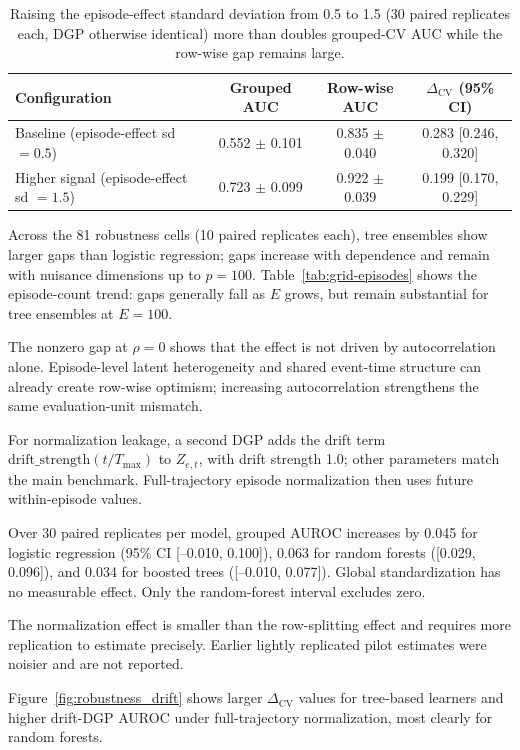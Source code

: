 \documentclass[runningheads]{llncs}
\newcommand{\1}{\mathbf{1}}
\newcommand{\DeltaCV}{\Delta_{\text{CV}}}
\begin{document}
\begin{table}[t]
\centering
\caption{Raising the episode-effect standard deviation from 0.5 to 1.5 (30 paired replicates each, DGP otherwise identical) more than doubles grouped-CV AUC while the row-wise gap remains large.}\label{tab:highsignal}
\small
\begin{tabular}{@{}lccc@{}}
\toprule
Configuration & Grouped AUC & Row-wise AUC & $\DeltaCV$ (95\% CI) \\
\midrule
Baseline (episode-effect sd $=0.5$) & 0.552 $\pm$ 0.101 & 0.835 $\pm$ 0.040 & 0.283 [0.246, 0.320] \\
Higher signal (episode-effect sd $=1.5$) & 0.723 $\pm$ 0.099 & 0.922 $\pm$ 0.039 & 0.199 [0.170, 0.229] \\
\bottomrule
\end{tabular}
\end{table}

Across the 81 robustness cells (10 paired replicates each), tree ensembles show larger gaps than logistic regression; gaps increase with dependence and remain with nuisance dimensions up to $p=100$. Table~\ref{tab:grid-episodes} shows the episode-count trend: gaps generally fall as $E$ grows, but remain substantial for tree ensembles at $E=100$.

The nonzero gap at $\rho=0$ shows that the effect is not driven by autocorrelation alone. Episode-level latent heterogeneity and shared event-time structure can already create row-wise optimism; increasing autocorrelation strengthens the same evaluation-unit mismatch.

For normalization leakage, a second DGP adds the drift term $\text{drift\_strength}(t/T_{\max})$ to $Z_{e,t}$, with drift strength 1.0; other parameters match the main benchmark. Full-trajectory episode normalization then uses future within-episode values.

Over 30 paired replicates per model, grouped AUROC increases by 0.045 for logistic regression (95\% CI [--0.010, 0.100]), 0.063 for random forests ([0.029, 0.096]), and 0.034 for boosted trees ([--0.010, 0.077]). Global standardization has no measurable effect. Only the random-forest interval excludes zero.

The normalization effect is smaller than the row-splitting effect and requires more replication to estimate precisely. Earlier lightly replicated pilot estimates were noisier and are not reported.

Figure~\ref{fig:robustness_drift} shows larger $\DeltaCV$ values for tree-based learners and higher drift-DGP AUROC under full-trajectory normalization, most clearly for random forests.
\end{document}
